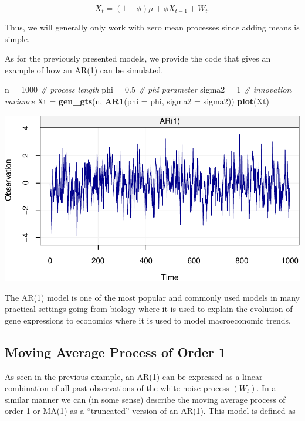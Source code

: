 \documentclass[]{book}
\newenvironment{Shaded}{\begin{snugshade}}{\end{snugshade}}
\newcommand{\KeywordTok}[1]{\textcolor[rgb]{0.13,0.29,0.53}{\textbf{#1}}}
\newcommand{\DataTypeTok}[1]{\textcolor[rgb]{0.13,0.29,0.53}{#1}}
\newcommand{\DecValTok}[1]{\textcolor[rgb]{0.00,0.00,0.81}{#1}}
\newcommand{\FloatTok}[1]{\textcolor[rgb]{0.00,0.00,0.81}{#1}}
\newcommand{\StringTok}[1]{\textcolor[rgb]{0.31,0.60,0.02}{#1}}
\newcommand{\CommentTok}[1]{\textcolor[rgb]{0.56,0.35,0.01}{\textit{#1}}}
\newcommand{\NormalTok}[1]{#1}
\theoremstyle{definition}
\theoremstyle{definition}
\theoremstyle{definition}
\theoremstyle{remark}
\begin{document}
\[X_t = \left(1 - \phi \right) \mu + \phi X_{t-1} + W_t.\]

Thus, we will generally only work with zero mean processes since adding
means is simple.

As for the previously presented models, we provide the code that gives
an example of how an AR(1) can be simulated.

\begin{Shaded}
\begin{Highlighting}[]
\NormalTok{n =}\StringTok{ }\DecValTok{1000}                              \CommentTok{# process length}
\NormalTok{phi =}\StringTok{ }\FloatTok{0.5}                             \CommentTok{# phi parameter}
\NormalTok{sigma2 =}\StringTok{ }\DecValTok{1}                            \CommentTok{# innovation variance}
\NormalTok{Xt =}\StringTok{ }\KeywordTok{gen_gts}\NormalTok{(n, }\KeywordTok{AR1}\NormalTok{(}\DataTypeTok{phi =}\NormalTok{ phi, }\DataTypeTok{sigma2 =}\NormalTok{ sigma2))}
\KeywordTok{plot}\NormalTok{(Xt)}
\end{Highlighting}
\end{Shaded}

\includegraphics{ts_files/figure-latex/example_AR1-1.pdf}

The AR(1) model is one of the most popular and commonly used models in
many practical settings going from biology where it is used to explain
the evolution of gene expressions to economics where it is used to model
macroeconomic trends.

\subsection{Moving Average Process of Order 1}\label{ma1}

As seen in the previous example, an AR(1) can be expressed as a linear
combination of all past observations of the white noise process
\((W_t)\). In a similar manner we can (in some sense) describe the
moving average process of order 1 or MA(1) as a ``truncated'' version of
an AR(1). This model is defined as
\end{document}
